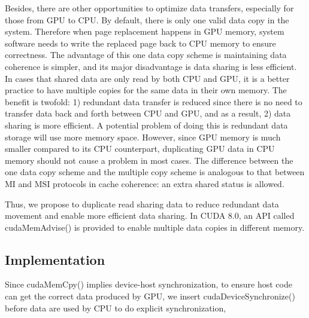 Besides, there are other opportunities to optimize data transfers, especially for those from GPU to CPU.
By default, there is only one valid data copy in the system.
Therefore when page replacement happens in GPU memory, system software needs to write the replaced page back to CPU memory to ensure correctness.
The advantage of this one data copy scheme is maintaining data coherence is simpler, and its major disadvantage is data sharing is less efficient.
In cases that shared data are only read by both CPU and GPU, it is a better practice to have multiple copies for the same data in their own memory.
The benefit is twofold: 1) redundant data transfer is reduced since there is no need to transfer data back and forth between CPU and GPU, and as a result, 2) data sharing is more efficient.
A potential problem of doing this is redundant data storage will use more memory space.
However, since GPU memory is much smaller compared to its CPU counterpart, duplicating GPU data in CPU memory should not cause a problem in most cases.
The difference between the one data copy scheme and the multiple copy scheme is analogous to that between MI and MSI protocols in cache coherence: an extra shared status is allowed.

Thus, we propose to duplicate read sharing data to reduce redundant data movement and enable more efficient data sharing.
In CUDA 8.0, an API called cudaMemAdvise() is provided to enable multiple data copies in different memory.

\subsection{Implementation}
\label{sect:tech:transfer}

Since cudaMemCpy() implies device-host synchronization, to ensure host code can get the correct data produced by GPU, we insert cudaDeviceSynchronize() before data are used by CPU to do explicit synchronization,
